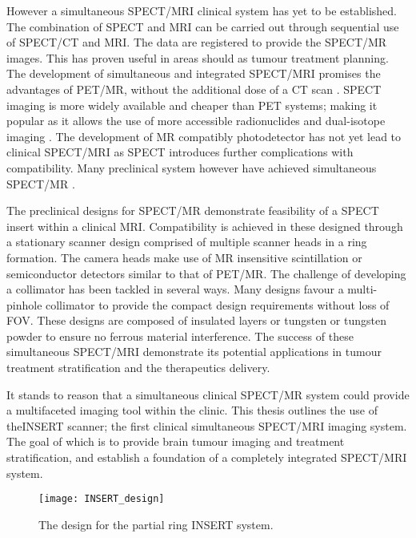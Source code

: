 However a simultaneous \acrshort{SPECT/MRI} clinical system has yet to be established. The combination of \acrshort{SPECT} and \acrshort{MRI} can be carried out through sequential use of \acrshort{SPECT/CT} and \acrshort{MRI}. The data are registered to provide the \acrshort{SPECT/MR} images. This has proven useful in areas should as tumour treatment planning. The development of simultaneous and integrated \acrshort{SPECT/MRI} promises the advantages of \acrshort{PET/MR}, without the additional dose of a \acrshort{CT} scan \cite{en2019ImageStudy}. \acrshort{SPECT} imaging is more widely available and cheaper than \acrshort{PET} systems; making it popular as it allows the use of more accessible radionuclides and dual-isotope imaging \cite{deRosales2014PotentialAgents}. The development of \acrshort{MR} compatibly photodetector has not yet lead to clinical \acrshort{SPECT/MRI} as \acrshort{SPECT} introduces further complications with compatibility. Many preclinical system however have achieved simultaneous \acrshort{SPECT/MR} \cite{Meng2007DesignImaging}.

The preclinical designs for \acrshort{SPECT/MR} demonstrate feasibility of a \acrshort{SPECT} insert within a clinical \acrshort{MRI}. Compatibility is achieved in these designed through a stationary scanner design comprised of multiple scanner heads in a ring formation. The camera heads make use of \acrshort{MR} insensitive scintillation or semiconductor detectors similar to that of \acrshort{PET/MR}. The challenge of developing a collimator has been tackled in several ways. Many designs favour a multi-pinhole collimator to provide the compact design requirements without loss of \acrshort{FOV}. These designs are composed of insulated layers or tungsten or tungsten powder to ensure no ferrous material interference. The success of these simultaneous \acrshort{SPECT/MRI} demonstrate its potential applications in tumour treatment stratification and the therapeutics delivery. 

It stands to reason that a simultaneous clinical \acrshort{SPECT/MR} system could provide a multifaceted imaging tool within the clinic. This thesis outlines the use of the\acrshort{INSERT} scanner; the first clinical simultaneous \acrshort{SPECT/MRI} imaging system. The goal of which is to provide brain tumour imaging and treatment stratification, and establish a foundation of a completely integrated \acrshort{SPECT/MRI} system. 

\begin{figure}[htp]
    \centering
    \texttt{[image: INSERT\_design]} %
    \caption{The design for the partial ring INSERT system.} \label{fig:INSERT}
\end{figure}

